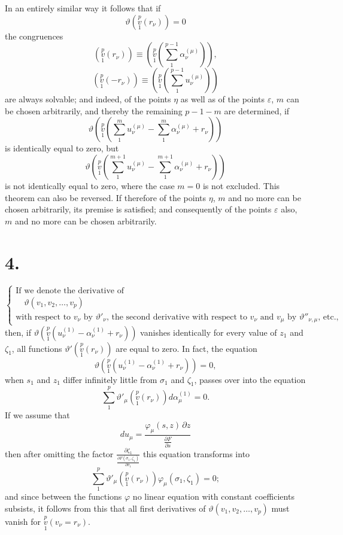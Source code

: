 \documentclass{article}
\begin{document}
In an entirely similar way it follows that if
\[
\vartheta\left(\overset{p}{\underset{1}{v}}(r_\nu)\right) = 0
\]
the congruences
\[
\tag{(4.)}
\left(\overset{p}{\underset{1}{v}}(r_\nu)\right) \equiv \left(\overset{p}{\underset{1}{v}}\left(\sum_1^{p-1} \alpha_\nu^{(\mu)}\right)\right),
\]
\[
\tag{(5.)}
\left(\overset{p}{\underset{1}{v}}(-r_\nu)\right) \equiv \left(\overset{p}{\underset{1}{v}}\left(\sum_1^{p-1} u_\nu^{(\mu)}\right)\right)
\]
are always solvable; and indeed, of the points $\eta$ as well as of the points $\varepsilon$, $m$ can be chosen arbitrarily, and thereby the remaining $p-1-m$ are determined, if
\[
\vartheta\left(\overset{p}{\underset{1}{v}}\left(\sum_1^m u_\nu^{(\mu)} - \sum_1^m \alpha_\nu^{(\mu)} + r_\nu\right)\right)
\]
is identically equal to zero, but
\[
\vartheta\left(\overset{p}{\underset{1}{v}}\left(\sum_1^{m+1} u_\nu^{(\mu)} - \sum_1^{m+1} \alpha_\nu^{(\mu)} + r_\nu\right)\right)
\]
is not identically equal to zero, where the case $m=0$ is not excluded. This theorem can also be reversed. If therefore of the points $\eta$, $m$ and no more can be chosen arbitrarily, its premise is satisfied; and consequently of the points $\varepsilon$ also, $m$ and no more can be chosen arbitrarily.

\section*{4.}

\[
\tag{(1.)}
\left\{
\begin{array}{l}
\text{If we denote the derivative of} \\
\quad \vartheta(v_1, v_2, \dots, v_p) \\
\text{with respect to } v_\nu \text{ by } \vartheta'_\nu\text{, the second derivative with respect to } v_\nu \text{ and } v_\mu \text{ by } \vartheta''_{\nu,\mu}\text{, etc.,}
\end{array}
\right.
\]
then, if $\vartheta\left(\overset{p}{\underset{1}{v}}(u_\nu^{(1)} - \alpha_\nu^{(1)} + r_\nu)\right)$ vanishes identically for every value of $z_1$ and $\zeta_1$, all functions $\vartheta'\left(\overset{p}{\underset{1}{v}}(r_\nu)\right)$ are equal to zero. In fact, the equation
\[
\vartheta\left(\overset{p}{\underset{1}{v}}(u_\nu^{(1)} - \alpha_\nu^{(1)} + r_\nu)\right) = 0,
\]
when $s_1$ and $z_1$ differ infinitely little from $\sigma_1$ and $\zeta_1$, passes over into the equation
\[
\sum_1^p \vartheta'_\mu\left(\overset{p}{\underset{1}{v}}(r_\nu)\right) d\alpha_\mu^{(1)} = 0.
\]
If we assume that
\[
du_\mu = \frac{\varphi_\mu(s, z)\,\partial z}{\displaystyle\frac{\partial F}{\partial s}}
\]
then after omitting the factor $\displaystyle\frac{\partial \zeta_1}{\displaystyle\frac{\partial F(\sigma_1, \zeta_1)}{\partial \sigma_1}}$ this equation transforms into
\[
\sum_1^p \vartheta'_\mu\left(\overset{p}{\underset{1}{v}}(r_\nu)\right) \varphi_\mu(\sigma_1, \zeta_1) = 0;
\]
and since between the functions $\varphi$ no linear equation with constant coefficients subsists, it follows from this that all first derivatives of $\vartheta(v_1, v_2, \dots, v_p)$ must vanish for $\overset{p}{\underset{1}{v}}(v_\nu = r_\nu)$.
\end{document}
